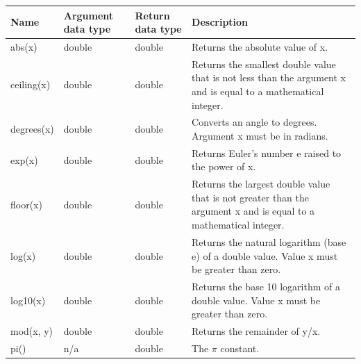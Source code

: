 \documentclass[11pt,a4paper]{ivoa}
\begin{document}
\begin{table}[thm]\footnotesize
    \begin{tabular}{|p{}|p{}|p{}|p{}|}
        \hline

        \hline
        \textbf{Name} &
        \textbf{Argument \newline data type} &
        \textbf{Return \newline data type} &
        \textbf{Description} \\

        \hline
        abs(x) &
        double&double &
        Returns the absolute value of x.\\

        \hline
        ceiling(x) &
        double&double &
        Returns the smallest double value that is not less than the argument x and is equal to a mathematical integer.\\

        \hline
        degrees(x) &
        double &
        double &
        Converts an angle to degrees. Argument x must be in radians.\\

        \hline
        exp(x) &
        double &
        double &
        Returns Euler’s number e raised to the power of x.\\

        \hline
        floor(x) &
        double &
        double &
        Returns the largest double value that is not greater than the argument x and is equal to a mathematical integer.\\

        \hline
        log(x) &
        double &
        double &
        Returns the natural logarithm (base e) of a double value. Value x must be greater than zero.\\
        
        \hline
        log10(x) &
        double &
        double &
        Returns the base 10 logarithm of a double value. Value x must be greater than zero.\\

        \hline
        mod(x, y) &
        double &
        double &
        Returns the remainder of y/x.\\
        
        \hline
        pi() &
        n/a &
        double &
        The \(\pi\) constant.\\
        

\end{tabular}
\end{table}
\end{document}
